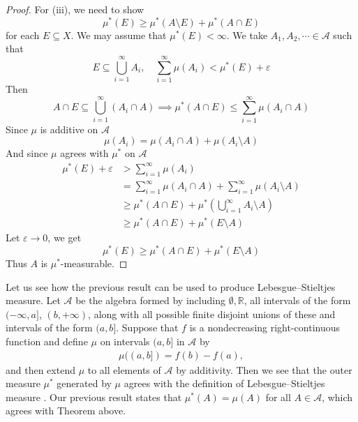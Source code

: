 \documentclass[../main.tex]{subfiles}
\begin{document}
\begin{proof}
    For (iii), we need to show \[
    \mu ^{*}\left( E \right)\ge \mu ^{*}\left( A\setminus E \right)+ \mu ^{*}\left( A\cap E \right)   
    \] for each \(  E\subseteq X  \). We may assume that \(  \mu ^{*}\left( E \right)< \infty   \).  We take \(  A_1,A_2,\cdots \in \mathcal{A}  \) such that \[
    E\subseteq \bigcup _{i= 1}^{\infty}A_{i},\quad \sum _{i= 1}^{\infty}\mu \left( A_{i} \right)< \mu ^{*}\left( E \right)+  \varepsilon   
    \] Then \[
    A\cap E\subseteq \bigcup _{i= 1}^{\infty} \left( A_{i}\cap A \right)\implies  \mu ^{*}\left( A\cap E \right)\le \sum _{i= 1}^{\infty}\mu \left( A_{i}\cap A \right)   
    \]  Since \(  \mu   \) is additive on \(  \mathcal{A}  \)   \[
    \mu \left( A_{i} \right)= \mu \left( A_{i}\cap A \right)+ \mu \left( A_{i}\setminus A \right)   
    \] And since \(  \mu   \) agrees with \(  \mu ^{*}  \) on \(  \mathcal{A}  \)   \[
    \begin{aligned}
    \mu ^{*}\left( E \right)+  \varepsilon &> \sum _{i= 1}^{\infty}\mu \left( A_{i} \right)\\ 
     &= \sum _{i= 1}^{\infty}\mu \left( A_{i}\cap A \right)+ \sum _{i= 1}^{\infty}\mu \left( A_{i}\setminus A \right)\\ 
      &\ge \mu ^{*}\left( A\cap E \right)+ \mu ^{*}\left( \bigcup _{i= 1}^{\infty}A_{i}\setminus A \right)\\ 
       &\ge \mu ^{*}\left( A\cap E \right)+ \mu ^{*}\left( E\setminus A \right)         
    \end{aligned}
    \] Let \(   \varepsilon \to 0  \), we get \[
    \mu ^{*}\left( E \right)\ge \mu ^{*}\left( A\cap E \right)+ \mu ^{*}\left( E\setminus A \right)   
    \] Thus \(  A   \) is \(  \mu ^{*}  \)-measurable.   
\end{proof}

\begin{example}{}{}
Let us see how the previous result can be used to produce Lebesgue–Stieltjes measure. Let $\mathcal{A}$ be the algebra formed by including $\emptyset, \mathbb{R}$, all intervals of the form $(-\infty, a]$, $(b, +\infty)$, along with all possible finite disjoint unions of these and intervals of the form $(a, b]$. Suppose that $f$ is a nondecreasing right-continuous function and define $\mu$ on intervals $(a, b]$ in $\mathcal{A}$ by
\[\begin{aligned}
\mu((a, b]) = f(b) - f(a),
\end{aligned}\]
and then extend $\mu$ to all elements of $\mathcal{A}$ by additivity. Then we see that the outer measure $\mu^*$ generated by $\mu$  agrees with the definition of Lebesgue–Stieltjes measure . Our previous result states that $\mu^*(A) = \mu(A)$ for all $A \in \mathcal{A}$, which agrees with Theorem above.
\end{example}
\end{document}
